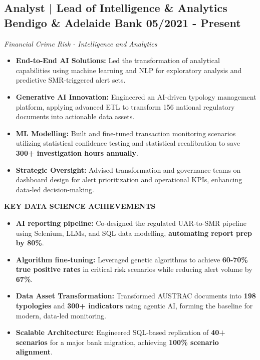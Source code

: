 \documentclass[11pt,a4paper]{article}
\newcommand{\linesection}[1]{%
  \vspace{10pt}%
  \noindent{\color{headerblue}\large\bfseries #1}\hspace{0.5em}{\color{sectionline}\leavevmode\leaders\hrule height 1.5pt\hfill\kern0pt}%
  \par\vspace{8pt}%
}
\begin{document}
\linesection{PROFESSIONAL EXPERIENCE}
\begin{mdframed}[style=dashedleft]

\subsection*{Analyst | Lead of Intelligence \& Analytics \hfill \textbf{Bendigo \& Adelaide Bank} \hfill 05/2021 - Present}
\textit{Financial Crime Risk - Intelligence and Analytics}

\begin{itemize}[leftmargin=1.5em, itemsep=4pt]
    \item \textbf{End-to-End AI Solutions:} Led the transformation of analytical capabilities using machine learning and NLP for exploratory analysis and predictive SMR-triggered alert sets.
    \item \textbf{Generative AI Innovation:} Engineered an AI-driven typology management platform, applying advanced ETL to transform 156 national regulatory documents into actionable data assets.
    \item \textbf{ML Modelling:} Built and fine-tuned transaction monitoring scenarios utilizing statistical confidence testing and statistical recalibration to save \textbf{300+ investigation hours annually}.
    \item \textbf{Strategic Oversight:} Advised transformation and governance teams on dashboard design for alert prioritization and operational KPIs, enhancing data-led decision-making.
\end{itemize}

\textbf{KEY DATA SCIENCE ACHIEVEMENTS}
\begin{itemize}[leftmargin=1.5em, itemsep=4pt]
    \item \textbf{AI reporting pipeline:} Co-designed the regulated UAR-to-SMR pipeline using Selenium, LLMs, and SQL data modelling, \textbf{automating report prep by 80\%}.
    \item \textbf{Algorithm fine-tuning:} Leveraged genetic algorithms to achieve \textbf{60-70\% true positive rates} in critical risk scenarios while reducing alert volume by \textbf{67\%}.
    \item \textbf{Data Asset Transformation:} Transformed AUSTRAC documents into \textbf{198 typologies} and \textbf{300+ indicators} using agentic AI, forming the baseline for modern, data-led monitoring.
    \item \textbf{Scalable Architecture:} Engineered SQL-based replication of \textbf{40+ scenarios} for a major bank migration, achieving \textbf{100\% scenario alignment}.
\end{itemize}


\end{mdframed}
\end{document}
